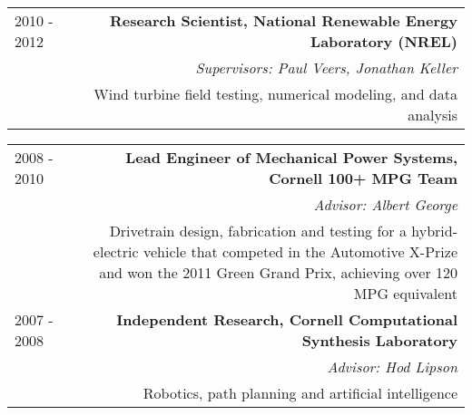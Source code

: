 \begin{tabular}{L!{\VRule}R}
2010 - 2012& {\bf Research Scientist, National Renewable Energy Laboratory (NREL)} \\
& {\it Supervisors: Paul Veers, Jonathan Keller} \\
& Wind turbine field testing, numerical modeling, and data analysis
\end{tabular}

\noindent \begin{tabular}{L!{\VRule}R}
2008 - 2010& {\bf Lead Engineer of Mechanical Power Systems, Cornell 100+ MPG Team} \\
& {\it Advisor: Albert George} \\
& Drivetrain design, fabrication and testing for a hybrid-electric vehicle that competed in the Automotive X-Prize and won the 2011 Green Grand Prix, achieving over 120 MPG equivalent\\
2007 - 2008& {\bf Independent Research, Cornell Computational Synthesis Laboratory} \\
& {\it Advisor: Hod Lipson}\\
&Robotics, path planning and artificial intelligence \\
\end{tabular}
